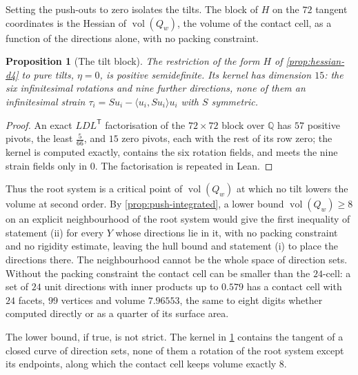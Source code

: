 \documentclass[11pt,reqno]{amsart}
\renewcommand{\_}{\origunderscore\allowbreak}
\numberwithin{equation}{section}
\theoremstyle{plain}
\newtheorem{prop}[thm]{Proposition}
\theoremstyle{definition}
\theoremstyle{remark}
\DeclareMathOperator{\vol}{vol}
\begin{document}
Setting the push-outs to zero isolates the tilts. The block of $H$ on the
$72$ tangent coordinates is the Hessian of $\vol(Q_w)$, the volume of the
contact cell, as a function of the directions alone, with no packing
constraint.

\begin{prop}[The tilt block]\label{prop:tilt-block}
The restriction of the form $H$ of \cref{prop:hessian-d4} to pure tilts,
$\eta=0$, is positive semidefinite. Its kernel has dimension $15$: the six
infinitesimal rotations and nine further directions, none of them an
infinitesimal strain $\tau_i=Su_i-\langle u_i,Su_i\rangle u_i$ with $S$
symmetric.
\end{prop}

\begin{proof}
An exact $LDL^{\mathsf T}$ factorisation of the $72\times72$ block over $\mathbb{Q}$
has $57$ positive pivots, the least $\tfrac5{66}$, and $15$ zero pivots, each
with the rest of its row zero; the kernel is computed exactly, contains the
six rotation fields, and meets the nine strain fields only in $0$. The
factorisation is repeated in Lean.
\end{proof}

Thus the root system is a critical point of $\vol(Q_w)$ at which no tilt
lowers the volume at second order. By \cref{prop:push-integrated}, a lower
bound $\vol(Q_w)\ge8$ on an explicit neighbourhood of the root system would
give the first inequality of statement (ii) for every $Y$ whose directions
lie in it, with no packing constraint and no rigidity estimate, leaving the
hull bound and statement (i) to place the directions there. The
neighbourhood cannot be the whole space of direction sets. Without the
packing constraint the contact cell can be smaller than the $24$-cell: a set
of $24$ unit directions with inner products up to $0.579$ has a contact
cell with $24$ facets, $99$ vertices and volume $7.96553$, the same to eight
digits whether computed directly or as a quarter of its surface area.

The lower bound, if true, is not strict. The kernel in
\cref{prop:tilt-block} contains the tangent of a closed curve of direction
sets, none of them a rotation of the root system except its endpoints, along
which the contact cell keeps volume exactly $8$.
\end{document}
